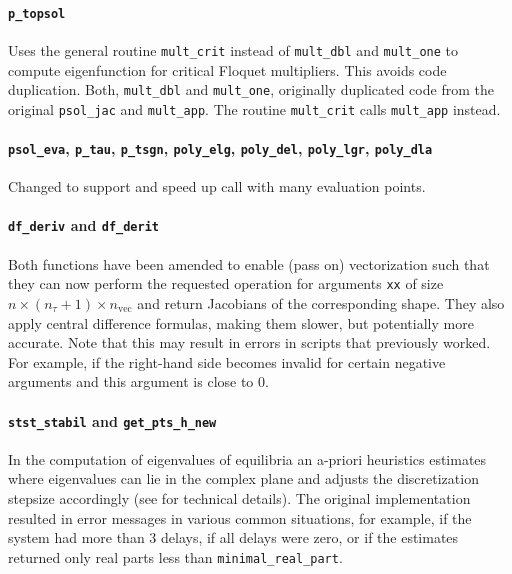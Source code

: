 \documentclass[11pt]{scrartcl}
\newcommand{\mt}[1]{\mathrm{#1}}
\newcommand{\blist}[1]{\mbox{\lstinline!#1!}}
\begin{document}
\paragraph{\blist{p_topsol}} Uses the general routine
\blist{mult_crit} instead of \blist{mult_dbl} and \blist{mult_one} to
compute eigenfunction for critical Floquet multipliers. This avoids
code duplication. Both, \blist{mult_dbl} and \blist{mult_one},
originally duplicated code from the original \blist{psol_jac} and
\blist{mult_app}. The routine \blist{mult_crit} calls \blist{mult_app}
instead.

\paragraph{\blist{psol_eva}, \blist{p_tau}, \blist{p_tsgn},
  \blist{poly_elg}, \blist{poly_del}, \blist{poly_lgr},
  \blist{poly_dla}} Changed to support and speed up call with many
evaluation points.


\paragraph{\blist{df_deriv} and \blist{df_derit}}
Both functions have been amended to enable (pass on) vectorization
such that they can now perform the requested operation for arguments
\blist{xx} of size $n\times (n_\tau+1)\times n_\mt{vec}$ and return
Jacobians of the corresponding shape. They also apply central
difference formulas, making them slower, but potentially more
accurate.  Note that this may result in errors in scripts that
previously worked. For example, if the right-hand side becomes invalid
for certain negative arguments and this argument is close to $0$.

\paragraph{\blist{stst_stabil} and \blist{get_pts_h_new}}
In the computation of eigenvalues of equilibria an a-priori heuristics
estimates where eigenvalues can lie in the complex plane and adjusts
the discretization stepsize accordingly (see \cite{VLR08} for
technical details). The original implementation resulted in error
messages in various common situations, for example, if the system had
more than $3$ delays, if all delays were zero, or if the estimates
returned only  real parts less than \blist{minimal_real_part}.
\end{document}
